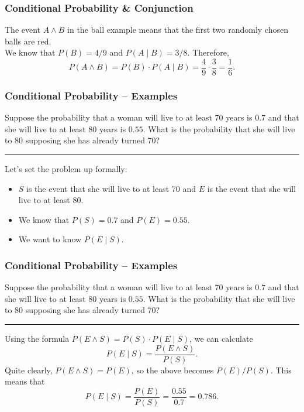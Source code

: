 \documentclass[aspectratio=169,11pt,usenames,dvipsnames]{beamer}
\begin{document}
\begin{frame}
 \frametitle{Conditional Probability \& Conjunction}
 \begin{center}
 \end{center}
 The event $A \wedge B$ in the ball example means that the first two randomly
 chosen balls are red.\pause\\
 We know that $P(B) = 4 / 9$ and $P(A \mid B) = 3 / 8$. Therefore,
 \[
  P(A \wedge B) = P(B) \cdot P(A \mid B) = \frac{4}{9} \cdot \frac{3}{8} =
  \frac{1}{6}.
 \]
\end{frame}
\begin{frame}
 \frametitle{Conditional Probability -- Examples}
 Suppose the probability that a woman will live to at least 70 years is $0.7$
 and that she will live to at least 80 years is $0.55$. What is the probability
 that she will live to 80 supposing she has already turned 70?\pause\\
 \vspace*{1em}
 \hrule
 Let's set the problem up formally:
 \begin{itemize}
  \item $S$ is the event that she will live to at least 70 and $E$ is the event
   that she will live to at least 80.
  \pause
  \item We know that $P(S) = 0.7$ and $P(E) = 0.55$.
  \pause
  \item We want to know $P(E \mid S)$.
 \end{itemize}
\end{frame}

\begin{frame}
 \frametitle{Conditional Probability -- Examples}
 Suppose the probability that a woman will live to at least 70 years is $0.7$
 and that she will live to at least 80 years is $0.55$. What is the probability
 that she will live to 80 supposing she has already turned 70?\\
 \vspace*{1em}
 \hrule
 Using the formula $P(E \wedge S) = P(S) \cdot P(E \mid S)$, we can calculate
 \[
  P(E \mid S) = \frac{P(E \wedge S)}{P(S)}.
 \]
 \pause
 Quite clearly, $P(E \wedge S) = P(E)$, so the above becomes $P(E) /
 P(S)$. \pause
 This means that
 \[
  P(E \mid S) = \frac{P(E)}{P(S)} = \frac{0.55}{0.7} = 0.786.
 \]
\end{frame}
\end{document}

